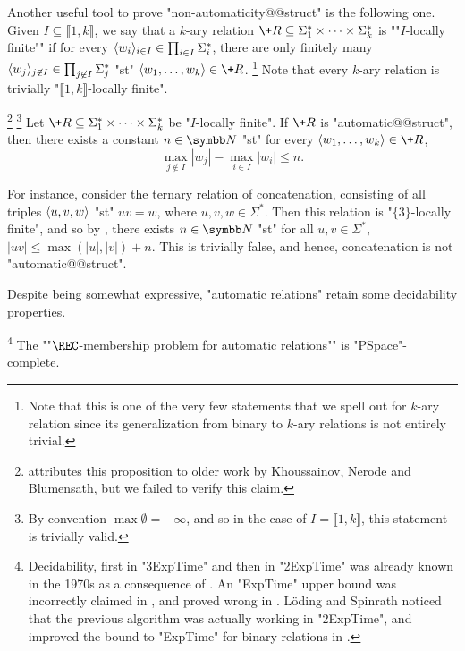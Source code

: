 Another useful tool to prove "non-automaticity@@struct" is the following one.
Given $I \subseteq \lBrack 1,k\rBrack$,
we say that a $k$-ary relation $\+R \subseteq \Sigma_1^* \times \cdots \times \Sigma_k^*$ is
""$I$-locally finite"" if for every $\langle w_i\rangle_{i\in I} \in \prod_{i\in I} \Sigma_i^*$,
there are only finitely many $\langle w_j\rangle_{j\not\in I} \in \prod_{j \not\in I} \Sigma_j^*$
"st" $\tup{w_1,\dotsc,w_k} \in \+R$.%
\footnote{Note that this is one of the very few statements
that we spell out for $k$-ary relation since its generalization from binary to $k$-ary relations
is not entirely trivial.}
Note that every $k$-ary relation is trivially "$\lBrack 1,k\rBrack$-locally finite".
\begin{proposition}
	\label{prop:non-synchronous}
	\!\footnote{\cite{KhoussainovNiesRubinStephan2007Automatic} attributes this proposition
	to older work by Khoussainov, Nerode and Blumensath, but we failed to verify this claim.}%
	\footnote{By convention $\max{\emptyset} = -\infty$, and so in the case
	of $I = \lBrack 1,k\rBrack$, this statement is trivially valid.}
	\AP\label{prop:bound-automatic-structures}
	Let $\+R \subseteq \Sigma_1^* \times \cdots \times \Sigma_k^*$ be "$I$-locally finite".
	If $\+R$ is "automatic@@struct", then there exists a constant $n\in\N$ "st" for every
	$\tup{w_1,\dotsc,w_k} \in \+R$,
	\[
		\max_{j \not\in I}{|w_j|} - \max_{i \in I}{|w_i|} \leq n.
	\]
\end{proposition}

For instance, consider the ternary relation of concatenation,
consisting of all triples $\langle u,v,w\rangle$ "st" $uv = w$, where $u,v,w\in\Sigma^*$.
Then this relation is "$\{3\}$-locally finite", and so by
, there exists $n\in \N$
"st" for all $u,v \in \Sigma^*$, $|uv| \leq \max{(|u|,|v|)} + n$.
This is trivially false, and hence, concatenation is not "automatic@@struct".

Despite being somewhat expressive, "automatic relations" retain some decidability properties. 
\begin{proposition}
	\!\footnote{Decidability, first in "3ExpTime" and then
	in "2ExpTime" was already known in the 1970s as a consequence
	of .
	An "ExpTime" upper bound was incorrectly claimed in \cite[Table~1]{CartonChoffrutGrigorieff2006DecisionProblems},
	and proved wrong in \cite[\S~4.1]{LodingSpinrath2019DecisionProblems}.
	Löding and Spinrath noticed that the previous algorithm was
	actually working in "2ExpTime", and improved 
	the bound to "ExpTime" for binary relations
	in \cite[Corollary~22]{LodingSpinrath2019DecisionProblems}.}
	The ""$\REC$-membership problem for automatic relations"" is "PSpace"-complete.
\end{proposition}

